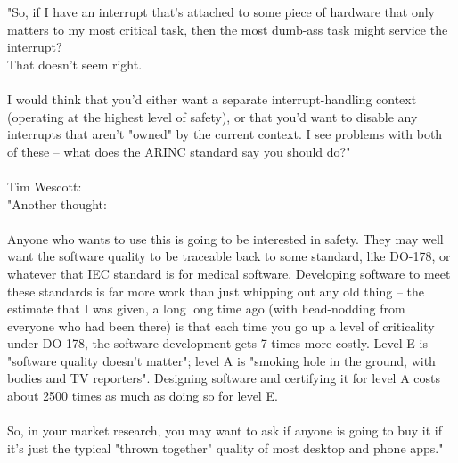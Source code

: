 "So, if I have an interrupt that's attached to some piece of hardware that only matters to my most 
critical task, then the most dumb-ass task might service the interrupt?\\
That doesn't seem right.\\
\\

I would think that you'd either want a separate interrupt-handling context (operating at the highest level 
of safety), or that you'd want to disable any interrupts that aren't "owned" by the current context.  I 
see problems with both of these -- what does the ARINC standard say you should do?"\\
\\
Tim Wescott:\\
"Another thought:\\
\\

Anyone who wants to use this is going to be interested in safety.  They may well want the software quality 
to be traceable back to some standard, like DO-178, or whatever that IEC standard is for medical software.  
Developing software to meet these standards is far more work than just whipping out any old thing -- the 
estimate that I was given, a long long time ago (with head-nodding from everyone who had been there) is 
that each time you go up a level of criticality under DO-178, the software development gets 7 times more 
costly.  Level E is "software quality doesn't matter"; level A is "smoking hole in the ground, with bodies 
and TV reporters".  Designing software and certifying it for level A costs about 2500 times as much as 
doing so for level E.\\
\\

So, in your market research, you may want to ask if anyone is going to buy it if it's just the typical "thrown together" quality of most desktop and phone apps."\\